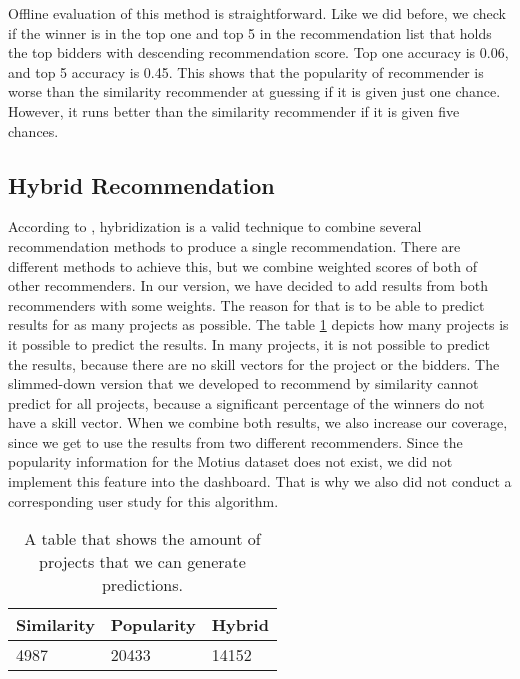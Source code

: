 Offline evaluation of this method is straightforward. Like we did before, we check if the winner is in the top one and top 5 in the recommendation list that holds the top bidders with descending recommendation score. Top one accuracy is 0.06, and top 5 accuracy is 0.45. This shows that the popularity of recommender is worse than the similarity recommender at guessing if it is given just one chance. However, it runs better than the similarity recommender if it is given five chances. 


\subsection{Hybrid Recommendation}

According to \cite{burke2002hybrid}, hybridization is a valid technique to combine several recommendation methods to produce a single recommendation. There are different methods to achieve this, but we combine weighted scores of both of other recommenders. In our version, we have decided to add results from both recommenders with some weights. The reason for that is to be able to predict results for as many projects as possible. The table \ref{tab:evaluation-amount-prediction} depicts how many projects is it possible to predict the results. In many projects, it is not possible to predict the results, because there are no skill vectors for the project or the bidders. The slimmed-down version that we developed to recommend by similarity cannot predict for all projects, because a significant percentage of the winners do not have a skill vector. When we combine both results, we also increase our coverage, since we get to use the results from two different recommenders. Since the popularity information for the Motius dataset does not exist, we did not implement this feature into the dashboard. That is why we also did not conduct a corresponding user study for this algorithm.

\begin{table}[htp]
	\caption[The number of predicted projects]{A table that shows the amount of projects that we can generate predictions.}\label{tab:evaluation-amount-prediction}
	\centering
	\begin{tabular}{l l l}
		\toprule
		Similarity & Popularity & Hybrid \\
		\midrule
		4987 & 20433 & 14152 \\
		\bottomrule
	\end{tabular}
\end{table}


